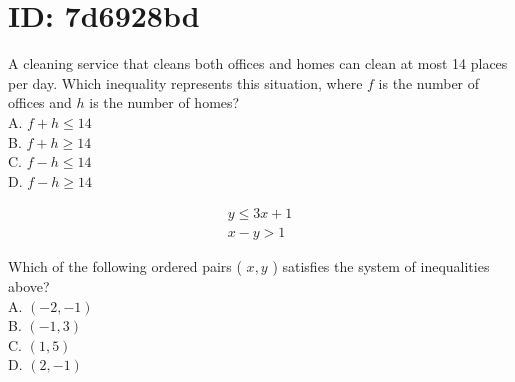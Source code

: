 \section*{ID: 7d6928bd}
A cleaning service that cleans both offices and homes can clean at most 14 places per day. Which inequality represents this situation, where $f$ is the number of offices and $h$ is the number of homes?\\
A. $f+h \leq 14$\\
B. $f+h \geq 14$\\
C. $f-h \leq 14$\\
D. $f-h \geq 14$

$$
\begin{array}{r}
y \leq 3 x+1 \\
x-y>1
\end{array}
$$

Which of the following ordered pairs ( $x, y$ ) satisfies the system of inequalities above?\\
A. $(-2,-1)$\\
B. $(-1,3)$\\
C. $(1,5)$\\
D. $(2,-1)$


